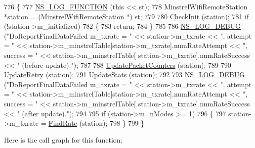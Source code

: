 \begin{DoxyCode}
776 \{
777   \hyperlink{log-macros-disabled_8h_a90b90d5bad1f39cb1b64923ea94c0761}{NS\_LOG\_FUNCTION} (\textcolor{keyword}{this} << st);
778   MinstrelWifiRemoteStation *station = (MinstrelWifiRemoteStation *) st;
779 
780   \hyperlink{classns3_1_1MinstrelWifiManager_a5768fc5c0a32ee601e476d51b7cd8eec}{CheckInit} (station);
781   \textcolor{keywordflow}{if} (!station->m\_initialized)
782     \{
783       \textcolor{keywordflow}{return};
784     \}
785 
786   \hyperlink{group__logging_ga413f1886406d49f59a6a0a89b77b4d0a}{NS\_LOG\_DEBUG} (\textcolor{stringliteral}{"DoReportFinalDataFailed m\_txrate = "} << station->m\_txrate << \textcolor{stringliteral}{", attempt = "} <<
       station->m\_minstrelTable[station->m\_txrate].numRateAttempt << \textcolor{stringliteral}{", success = "} << station->m\_minstrelTable[
      station->m\_txrate].numRateSuccess << \textcolor{stringliteral}{" (before update)."});
787 
788   \hyperlink{classns3_1_1MinstrelWifiManager_ac6a70510321a9f42af936e383c0e6865}{UpdatePacketCounters} (station);
789 
790   \hyperlink{classns3_1_1MinstrelWifiManager_af99109e3951c30e24f17519102959c81}{UpdateRetry} (station);
791   \hyperlink{classns3_1_1MinstrelWifiManager_a5702af5353375bbb7099b41b76fc7c21}{UpdateStats} (station);
792 
793   \hyperlink{group__logging_ga413f1886406d49f59a6a0a89b77b4d0a}{NS\_LOG\_DEBUG} (\textcolor{stringliteral}{"DoReportFinalDataFailed m\_txrate = "} << station->m\_txrate << \textcolor{stringliteral}{", attempt = "} <<
       station->m\_minstrelTable[station->m\_txrate].numRateAttempt << \textcolor{stringliteral}{", success = "} << station->m\_minstrelTable[
      station->m\_txrate].numRateSuccess << \textcolor{stringliteral}{" (after update)."});
794 
795   \textcolor{keywordflow}{if} (station->m\_nModes >= 1)
796     \{
797       station->m\_txrate = \hyperlink{classns3_1_1MinstrelWifiManager_ac1a095648370f1330715968da032b139}{FindRate} (station);
798     \}
799 \}
\end{DoxyCode}


Here is the call graph for this function\+:


